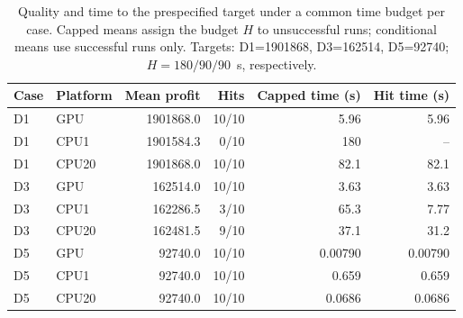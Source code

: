 \begin{table}[tbp]
\centering\small
\caption{Quality and time to the prespecified target under a common time budget per case. Capped means assign the budget $H$ to unsuccessful runs; conditional means use successful runs only. Targets: D1=1901868, D3=162514, D5=92740; $H=180/90/90$~s, respectively.}
\label{tab:platform-quality}
\begin{tabular}{llrrrr}
\toprule
Case & Platform & Mean profit & Hits & Capped time (s) & Hit time (s)\\
\midrule
D1 & GPU & 1901868.0 & 10/10 & 5.96 & 5.96\\
D1 & CPU1 & 1901584.3 & 0/10 & 180 & --\\
D1 & CPU20 & 1901868.0 & 10/10 & 82.1 & 82.1\\
D3 & GPU & 162514.0 & 10/10 & 3.63 & 3.63\\
D3 & CPU1 & 162286.5 & 3/10 & 65.3 & 7.77\\
D3 & CPU20 & 162481.5 & 9/10 & 37.1 & 31.2\\
D5 & GPU & 92740.0 & 10/10 & 0.00790 & 0.00790\\
D5 & CPU1 & 92740.0 & 10/10 & 0.659 & 0.659\\
D5 & CPU20 & 92740.0 & 10/10 & 0.0686 & 0.0686\\
\bottomrule
\end{tabular}
\end{table}
